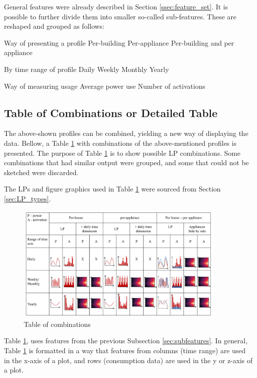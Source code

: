 General features were already described in Section \ref{ssec:feature_set}.
It is possible to further divide them into smaller so-called sub-features.
These are reshaped and grouped as follows:
\begin{outline}

\1 Way of presenting a profile
\2 Per-building 
\2 Per-appliance 
\2 Per-building and per appliance

\1 By time range of profile 
\2 Daily
\2 Weekly
\2 Monthly
\2 Yearly

\1 Way of measuring usage
\2 Average power use 
\2 Number of activations
\end{outline}


\subsection{Table of Combinations or Detailed Table}
\label{ssec:table_of_combinations}
The above-shown profiles can be combined, yielding a new way of displaying the data.
Bellow, a Table \ref{fig:map_fig} with combinations of the above-mentioned profiles is presented. 
The purpose of Table \ref{fig:map_fig} is to show possible LP combinations.
Some combinations that had similar output were grouped, and some that could not be sketched were discarded. 

The LPs and figure graphics used in Table \ref{fig:map_fig} were sourced from Section \ref{sec:LP_types}.

\begin{figure}
	\centering
	\includegraphics[width=0.9\textwidth]{Figures/profile_sketches/slide14.pdf}
  \caption{Table of combinations}
  \label{fig:map_fig}
\end{figure}

Table \ref{fig:map_fig}, uses features from the previous Subsection \ref{sec:subfeatures}. 
In general, Table \ref{fig:map_fig} is formatted in a way that features from columns (time range) are
used in the x-axis of a plot, and rows (consumption data) are used in the y or z-axis of a plot. 

